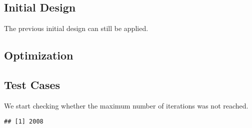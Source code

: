 \documentclass[
]{book}
\newenvironment{Shaded}{\begin{snugshade}}{\end{snugshade}}
\newcommand{\AttributeTok}[1]{\textcolor[rgb]{0.77,0.63,0.00}{#1}}
\newcommand{\DecValTok}[1]{\textcolor[rgb]{0.00,0.00,0.81}{#1}}
\newcommand{\FunctionTok}[1]{\textcolor[rgb]{0.00,0.00,0.00}{#1}}
\newcommand{\NormalTok}[1]{#1}
\newcommand{\OtherTok}[1]{\textcolor[rgb]{0.56,0.35,0.01}{#1}}
\newcommand{\SpecialCharTok}[1]{\textcolor[rgb]{0.00,0.00,0.00}{#1}}
\begin{document}
\hypertarget{initial-design-4}{%
\subsection{Initial Design}\label{initial-design-4}}

The previous initial design can still be applied.

\hypertarget{optimization-5}{%
\subsection{Optimization}\label{optimization-5}}

\begin{Shaded}
\end{Shaded}

\hypertarget{test-cases-5}{%
\subsection{Test Cases}\label{test-cases-5}}

We start checking whether the maximum number of iterations was not reached.

\begin{Shaded}
\end{Shaded}

\begin{verbatim}
## [1] 2008
\end{verbatim}

\begin{Shaded}
\end{Shaded}
\end{document}
